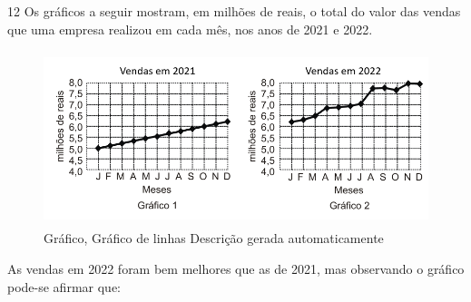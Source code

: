 \begin{escolha}
\begin{boxmedio}
\begin{boxmedio}
{\begin{boxpeq}
\begin{boxpeq}
{\begin{boxpeq}
\begin{boxmedio}
\begin{boxmedio}
\begin{boxpeq}
\begin{boxmedio}
\begin{boxpeq}
\begin{boxpeq}
\begin{boxpeq}
\begin{boxpeq}
\begin{boxmedio}
{\begin{boxmedio}
\begin{boxmedio}
\begin{boxpeq}
\begin{boxmedio}
\begin{boxpeq}
\begin{boxpeq}
\begin{boxpeq}
\begin{escolha}
{\begin{boxmedio}
\begin{boxpeq}
\begin{boxpeq}
\begin{boxpeq}
\begin{boxpeq}
\begin{boxpeq}
\begin{boxmedio}
\begin{boxpeq}
\begin{boxpeq}
\begin{boxpeq}
{\begin{boxpeq}
\begin{boxmedio}
\begin{boxpeq}
\begin{boxpeq}
\begin{boxpeq}
{\begin{boxpeq}
\begin{boxmedio}
{\begin{boxpeq}
\begin{boxpeq}
\begin{boxmedio}
\begin{boxmedio}
\begin{boxpeq}
\begin{boxpeq}
{\begin{boxpeq}
\begin{boxpeq}
\begin{boxpeq}
\begin{boxpeq}
\begin{boxpeq}
\begin{escolha}
\begin{escolha}
{\begin{boxmedio}
\begin{boxpeq}
\begin{q°}
\begin{boxmedio}
\begin{boxpeq}
\begin{boxpeq}
\begin{boxmedio}
\begin{boxmedio}
\begin{boxmedio}
\begin{boxmedio}
{\begin{escolha}
\begin{escolha}
\begin{escolha}
\begin{escolha}
\begin{escolha}
\begin{escolha}
\num{12} Os gráficos a seguir mostram, em milhões de reais, o total do
valor das vendas que uma empresa realizou em cada mês, nos anos de 2021
e 2022.

\begin{figure}
\centering
\includegraphics[width=4.73437in,height=2.00699in]{./_SAEB_9_MAT/media/image269.png}
\caption{Gráfico, Gráfico de linhas Descrição gerada automaticamente}
\end{figure}

As vendas em 2022 foram bem melhores que as de 2021, mas observando o
gráfico pode-se afirmar que:

\begin{escolha}


\end{escolha}
\end{escolha}
\end{escolha}
\end{escolha}
\end{escolha}
\end{escolha}
\end{escolha}}
\end{boxmedio}
\end{boxmedio}
\end{boxmedio}
\end{boxmedio}
\end{boxpeq}
\end{boxpeq}
\end{boxmedio}
\end{q°}
\end{boxpeq}
\end{boxmedio}}
\end{escolha}
\end{escolha}
\end{boxpeq}
\end{boxpeq}
\end{boxpeq}
\end{boxpeq}
\end{boxpeq}}
\end{boxpeq}
\end{boxpeq}
\end{boxmedio}
\end{boxmedio}
\end{boxpeq}
\end{boxpeq}}
\end{boxmedio}
\end{boxpeq}}
\end{boxpeq}
\end{boxpeq}
\end{boxpeq}
\end{boxmedio}
\end{boxpeq}}
\end{boxpeq}
\end{boxpeq}
\end{boxpeq}
\end{boxmedio}
\end{boxpeq}
\end{boxpeq}
\end{boxpeq}
\end{boxpeq}
\end{boxpeq}
\end{boxmedio}}
\end{escolha}
\end{boxpeq}
\end{boxpeq}
\end{boxpeq}
\end{boxmedio}
\end{boxpeq}
\end{boxmedio}
\end{boxmedio}}
\end{boxmedio}
\end{boxpeq}
\end{boxpeq}
\end{boxpeq}
\end{boxpeq}
\end{boxmedio}
\end{boxpeq}
\end{boxmedio}
\end{boxmedio}
\end{boxpeq}}
\end{boxpeq}
\end{boxpeq}}
\end{boxmedio}
\end{boxmedio}
\end{escolha}
